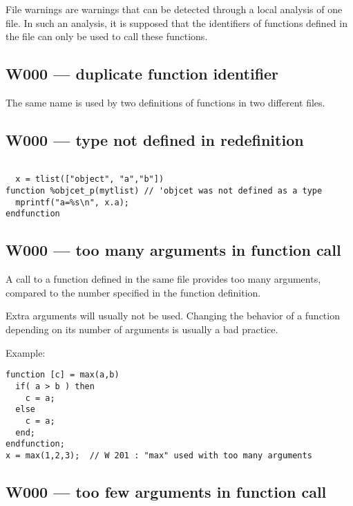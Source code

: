 File warnings are warnings that can be detected through a local
analysis of one file. In such an analysis, it is supposed that the
identifiers of functions defined in the file can only be used to call
these functions.

\subsection{W000 --- duplicate function identifier}




The same name is used by two definitions of functions in
two different files.



\subsection{W000 --- type not defined in redefinition}


\begin{verbatim}

  x = tlist(["object", "a","b"])
function %objcet_p(mytlist) // 'objcet was not defined as a type
  mprintf("a=%s\n", x.a);
endfunction
\end{verbatim}


\subsection{W000 --- too many arguments in function call}




A call to a function defined in the same file provides too many
arguments, compared to the number specified in the function definition.



Extra arguments will usually not be used. Changing the behavior
of a function depending on its number of arguments is usually a bad
practice.



Example:\begin{verbatim}
function [c] = max(a,b)
  if( a > b ) then
    c = a;
  else
    c = a;
  end;
endfunction;
x = max(1,2,3);  // W 201 : "max" used with too many arguments
\end{verbatim}




\subsection{W000 --- too few arguments in function call }




